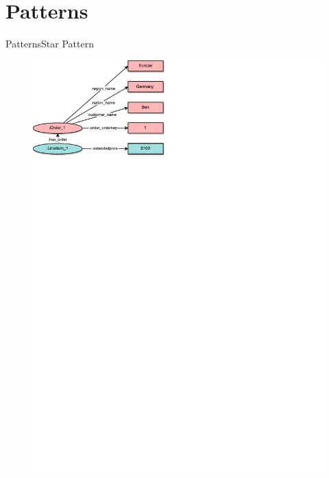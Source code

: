 \newcommand{\patsec}{Patterns}
\section{\patsec}
\begin{frame}{\patsec}{Star Pattern}
    \begin{figure}
        \includegraphics[trim=0 648 255 0,clip,width=1\textwidth]{images/starpattern.pdf}
    \end{figure}
\end{frame}

